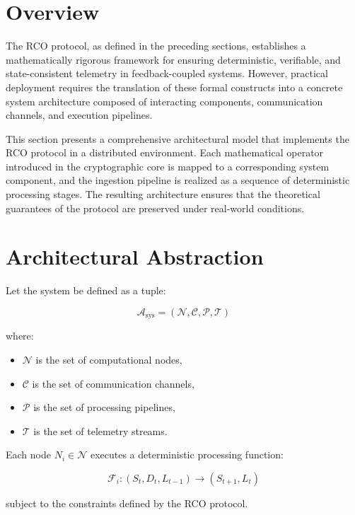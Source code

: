 \section{Overview}

The RCO protocol, as defined in the preceding sections, establishes a mathematically rigorous framework for ensuring deterministic, verifiable, and state-consistent telemetry in feedback-coupled systems. However, practical deployment requires the translation of these formal constructs into a concrete system architecture composed of interacting components, communication channels, and execution pipelines.

This section presents a comprehensive architectural model that implements the RCO protocol in a distributed environment. Each mathematical operator introduced in the cryptographic core is mapped to a corresponding system component, and the ingestion pipeline is realized as a sequence of deterministic processing stages. The resulting architecture ensures that the theoretical guarantees of the protocol are preserved under real-world conditions.

\section{Architectural Abstraction}

Let the system be defined as a tuple:

\begin{equation}
\mathcal{A}_{\text{sys}} = (\mathcal{N}, \mathcal{C}, \mathcal{P}, \mathcal{T})
\end{equation}

where:
\begin{itemize}
\item $\mathcal{N}$ is the set of computational nodes,
\item $\mathcal{C}$ is the set of communication channels,
\item $\mathcal{P}$ is the set of processing pipelines,
\item $\mathcal{T}$ is the set of telemetry streams.
\end{itemize}

Each node $N_i \in \mathcal{N}$ executes a deterministic processing function:

\begin{equation}
\mathcal{F}_i: (S_t, D_t, L_{t-1}) \rightarrow (S_{t+1}, L_t)
\end{equation}

subject to the constraints defined by the RCO protocol.

